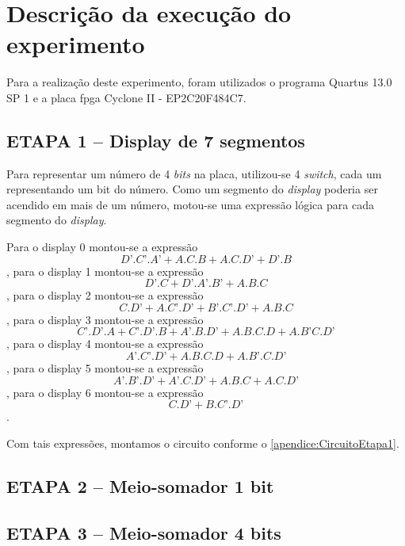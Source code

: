 
\chapter{Descrição da execução do experimento}

	Para a realização deste experimento, foram utilizados o programa Quartus 13.0 SP 1 e a placa \ac{fpga}
Cyclone II - EP2C20F484C7.

	\section{ETAPA 1 – Display de 7 segmentos}
		Para representar um número de 4 \textit{bits} na placa, utilizou-se 4 \textit{switch}, cada um
		representando um bit do número. Como um segmento do \textit{display} poderia ser acendido
		em mais de um número,
		motou-se uma expressão lógica para cada segmento do \textit{display}.

		Para o display 0 montou-se a expressão
		$$D’.C’.A’ + A.C.B + A.C.D’ + D’.B$$,
		para o display 1 montou-se a expressão
		$$D’.C+D’.A’.B’+A.B.C$$,
		para o display 2 montou-se a expressão
		$$C.D’+A.C’.D’+B’.C’.D’+A.B.C$$,
		para o display 3 montou-se a expressão
		$$C’.D’.A+C’.D’.B+A’.B.D’+A.B.C.D+A.B’C.D’$$,
		para o display 4 montou-se a expressão
		$$A’.C’.D’+A.B.C.D+A.B’.C.D’$$,
		para o display 5 montou-se a expressão
		$$A’.B’.D’+A’.C.D’+A.B.C+A.C.D’$$,
		para o display 6 montou-se a expressão
		$$C.D’+B.C’.D’$$.

		Com tais expressões, montamos o circuito conforme o \autoref{apendice:CircuitoEtapa1}.

	\section{ETAPA 2 – Meio-somador 1 bit}
		
	\section{ETAPA 3 – Meio-somador 4 bits}








